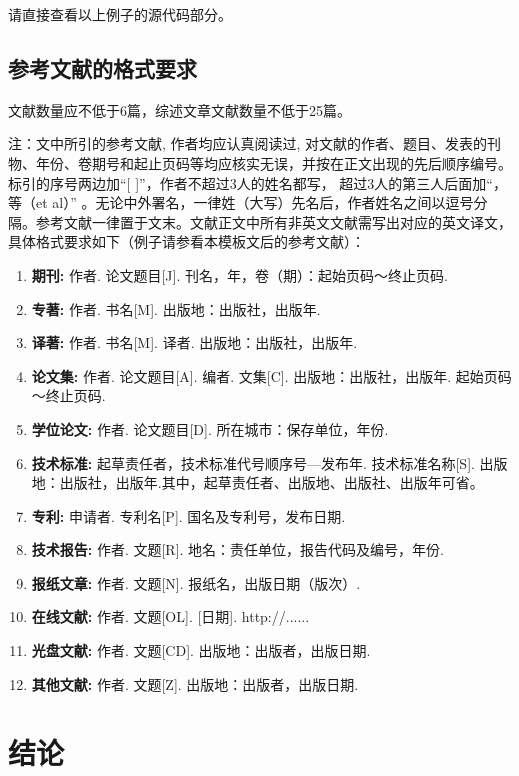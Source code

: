 \documentclass[UTF8]{csoarticle}
\begin{document}
请直接查看以上例子的源代码部分。

\subsection{参考文献的格式要求}

文献数量应不低于6篇，综述文章文献数量不低于25篇。

注：文中所引的参考文献, 作者均应认真阅读过, 对文献的作者、题目、发表的刊物、年份、卷期号和起止页码等均应核实无误，并按在正文出现的先后顺序编号。标引的序号两边加“[ ]”，作者不超过3人的姓名都写， 超过3人的第三人后面加“，等（et al）” 。无论中外署名，一律姓（大写）先名后，作者姓名之间以逗号分隔。参考文献一律置于文末。文献正文中所有非英文文献需写出对应的英文译文，具体格式要求如下（例子请参看本模板文后的参考文献）：
\begin{enumerate}
\item\textbf{期刊:}     作者. 论文题目[J]. 刊名，年，卷（期）：起始页码～终止页码.
\item\textbf{专著:}     作者. 书名[M]. 出版地：出版社，出版年.
\item\textbf{译著:}     作者. 书名[M]. 译者. 出版地：出版社，出版年.
\item\textbf{论文集:}   作者. 论文题目[A]. 编者. 文集[C]. 出版地：出版社，出版年. 起始页码～终止页码.
\item\textbf{学位论文:} 作者. 论文题目[D]. 所在城市：保存单位，年份.
\item\textbf{技术标准:} 起草责任者，技术标准代号顺序号—发布年. 技术标准名称[S]. 出版地：出版社，出版年.其中，起草责任者、出版地、出版社、出版年可省。
\item\textbf{专利:}     申请者. 专利名[P]. 国名及专利号，发布日期.
\item\textbf{技术报告:} 作者. 文题[R]. 地名：责任单位，报告代码及编号，年份.
\item\textbf{报纸文章:} 作者. 文题[N]. 报纸名，出版日期（版次）.
\item\textbf{在线文献:} 作者. 文题[OL]. [日期]. http://......
\item\textbf{光盘文献:} 作者. 文题[CD]. 出版地：出版者，出版日期.
\item\textbf{其他文献:} 作者. 文题[Z]. 出版地：出版者，出版日期.
\end{enumerate}

\section{结论}
\end{document}
